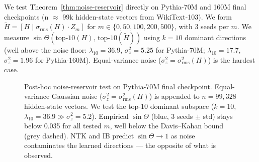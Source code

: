 \documentclass[10pt]{article}
\newcommand{\sinT}{\sin\Theta}
\theoremstyle{plain}
\theoremstyle{definition}
\theoremstyle{remark}
\begin{document}
We test Theorem~\ref{thm:noise-reservoir} directly on Pythia-70M and 160M
final checkpoints (n $\approx$ 99k hidden-state vectors from WikiText-103).
We form $\tilde H = [H \mid \sigma_{\mathrm{rms}}(H) \cdot Z_m]$ for
$m \in \{0, 50, 100, 200, 500\}$, with 3 seeds per $m$.
We measure $\sinT(\text{top-}10(H),\, \text{top-}10(\tilde H))$ using
$k=10$ dominant directions (well above the noise floor: $\lambda_{10} = 36.9$,
$\sigma_z^2 = 5.25$ for Pythia-70M; $\lambda_{10}=17.7$,
$\sigma_z^2 = 1.96$ for Pythia-160M).
Equal-variance noise ($\sigma_z^2 = \sigma_{\mathrm{rms}}^2(H)$) is the
hardest case.

\begin{figure}[H]
\centering
{}
\caption{Post-hoc noise-reservoir test on Pythia-70M final checkpoint.
Equal-variance Gaussian noise ($\sigma_z^2 = \sigma_{\mathrm{rms}}^2(H)$)
is appended to $n = 99{,}328$ hidden-state vectors.
We test the top-10 dominant subspace ($k=10$, $\lambda_{10} = 36.9 \gg \sigma_z^2 = 5.2$).
Empirical $\sinT$ (blue, 3 seeds $\pm$ std) stays below 0.035 for all tested $m$,
well below the Davis--Kahan bound (grey dashed).
NTK and IB predict $\sinT \to 1$ as noise contaminates the learned directions --- the
opposite of what is observed.}
\label{fig:nr-posthoc}
\end{figure}
\end{document}
